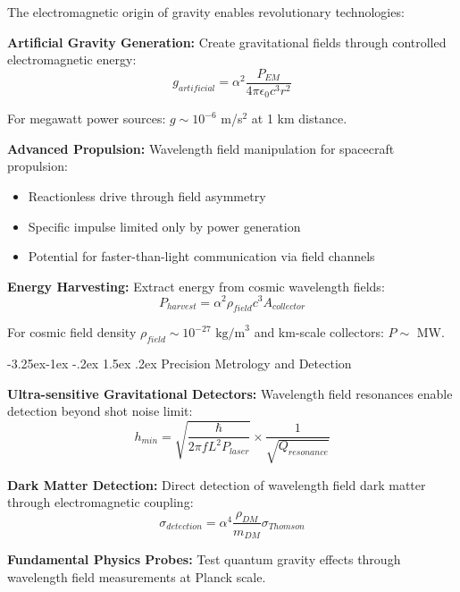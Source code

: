 \documentclass[10pt,twocolumn]{article}
\makeatletter
\renewcommand\subsection{\@startsection{subsection}{2}{\z@}%
  {-3.25ex\@plus -1ex \@minus -.2ex}%
  {1.5ex \@plus .2ex}%
  {\normalfont\normalsize\bfseries}}
\makeatother
\begin{document}
The electromagnetic origin of gravity enables revolutionary technologies:

\textbf{Artificial Gravity Generation:}
Create gravitational fields through controlled electromagnetic energy:
\begin{equation}
g_{artificial} = \alpha^2 \frac{P_{EM}}{4\pi \epsilon_0 c^3 r^2}
\end{equation}

For megawatt power sources: $g \sim 10^{-6}$ m/s$^2$ at 1 km distance.

\textbf{Advanced Propulsion:}
Wavelength field manipulation for spacecraft propulsion:
\begin{itemize}
\item Reactionless drive through field asymmetry
\item Specific impulse limited only by power generation
\item Potential for faster-than-light communication via field channels
\end{itemize}

\textbf{Energy Harvesting:}
Extract energy from cosmic wavelength fields:
\begin{equation}
P_{harvest} = \alpha^2 \rho_{field} c^3 A_{collector}
\end{equation}

For cosmic field density $\rho_{field} \sim 10^{-27} \text{ kg/m}^3$ and km-scale collectors: $P \sim$ MW.

\subsection{Precision Metrology and Detection}

\textbf{Ultra-sensitive Gravitational Detectors:}
Wavelength field resonances enable detection beyond shot noise limit:
\begin{equation}
h_{min} = \sqrt{\frac{\hbar}{2\pi f L^2 P_{laser}}} \times \frac{1}{\sqrt{Q_{resonance}}}
\end{equation}

\textbf{Dark Matter Detection:}
Direct detection of wavelength field dark matter through electromagnetic coupling:
\begin{equation}
\sigma_{detection} = \alpha^4 \frac{\rho_{DM}}{m_{DM}} \sigma_{Thomson}
\end{equation}

\textbf{Fundamental Physics Probes:}
Test quantum gravity effects through wavelength field measurements at Planck scale.
\end{document}
